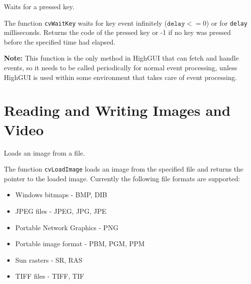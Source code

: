 Waits for a pressed key.


\begin{description}
\end{description}

The function \texttt{cvWaitKey} waits for key event infinitely ($ \texttt{delay} <= 0$) or for \texttt{delay} milliseconds. Returns the code of the pressed key or -1 if no key was pressed before the specified time had elapsed.

\textbf{Note:} This function is the only method in HighGUI that can fetch and handle events, so it needs to be called periodically for normal event processing, unless HighGUI is used within some environment that takes care of event processing.


\section{Reading and Writing Images and Video}

Loads an image from a file.


\begin{description}
\end{description}

The function \texttt{cvLoadImage} loads an image from the specified file and returns the pointer to the loaded image. Currently the following file formats are supported:
\begin{itemize}
\item Windows bitmaps - BMP, DIB
\item JPEG files - JPEG, JPG, JPE
\item Portable Network Graphics - PNG
\item Portable image format - PBM, PGM, PPM
\item Sun rasters - SR, RAS
\item TIFF files - TIFF, TIF
\end{itemize}

